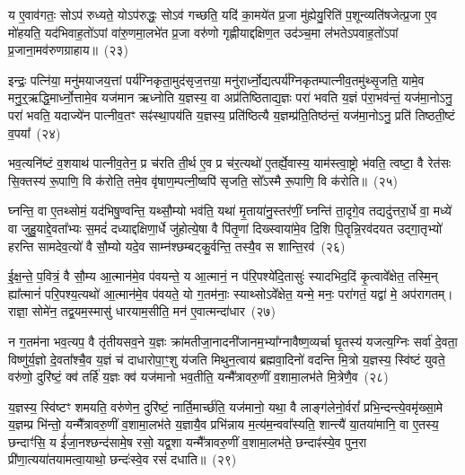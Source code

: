 य ए॒वाव॑गतः॒ सो\-ऽप॑ रुध्यते॒ यो\-ऽप॑रुद्धः॒ सो\-ऽव॑ गच्छति॒ यदि॑ का॒मये॑त प्र॒जा मु॑ह्येयु॒रिति॑ प॒शून्व्यति॑षजेत्प्र॒जा ए॒व मो॑हयति॒ यद॑भिवाह॒तो॑\-ऽपां वा॑रु॒णमा॒लभे॑त प्र॒जा वरु॑णो गृह्णीयाद्दक्षिण॒त उद॑ञ्च॒मा ल॑भते\-ऽपवाह॒तो॑\-ऽ\-पां प्र॒जाना॒मव॑रुणग्राहाय॥~(२३)

{\anuvakamend[{रेतो॒ यज॑माने दधाति लो॒क ऐ॒न्द्रꣳ स॒प्तत्रिꣳ॑शच्च}]}%

इन्द्रः॒ पत्नि॑या॒ मनु॑मयाजय॒त्तां पर्य॑ग्निकृता॒मुद॑सृज॒त्तया॒ मनु॑रार्ध्नो॒द्यत्पर्य॑ग्निकृतम्पात्नीव॒तमु॑थ्सृ॒जति॒ यामे॒व मनु॒र्॒\mbox{}ऋद्धि॒\-मार्ध्नो॒त्तामे॒व यज॑मान ऋध्नोति य॒ज्ञस्य॒ वा अप्र॑तिष्ठिताद्य॒ज्ञः परा॑ भवति य॒ज्ञं प॑रा॒भव॑न्तं॒ यज॑मा॒नो\-ऽनु॒ परा॑ भवति॒ यदाज्ये॑न पात्नीव॒तꣳ सꣴ॑स्था॒पय॑ति य॒ज्ञस्य॒ प्रति॑ष्ठित्यै य॒ज्ञम्प्र॑ति॒तिष्ठ॑न्तं॒ यज॑मा॒नो\-ऽनु॒ प्रति॑ तिष्ठती॒ष्टं व॒पया᳚~(२४)

भव॒त्यनि॑ष्टं व॒शयाथ॑ पात्नीव॒तेन॒ प्र च॑रति ती॒र्थ ए॒व प्र च॑र॒त्यथो॑ ए॒तर्\mbox{}ह्ये॒वास्य॒ याम॑स्त्वा॒ष्ट्रो भ॑वति॒ त्वष्टा॒ वै रेत॑सः सि॒क्तस्य॑ रू॒पाणि॒ वि क॑रोति॒ तमे॒व वृ॑षाण॒म्पत्नी॒ष्वपि॑ सृजति॒ सो᳚\-ऽस्मै रू॒पाणि॒ वि क॑रोति॥~(२५)

{\anuvakamend[{व॒पया॒ षट्त्रिꣳ॑शच्च}]}%

घ्नन्ति॒ वा ए॒तथ्सोमं॒ यद॑भिषु॒ण्वन्ति॒ यथ्सौ॒म्यो भव॑ति॒ यथा॑ मृ॒ताया॑नु॒स्तर॑णीं॒ घ्नन्ति॑ ता॒दृगे॒व तद्यदु॑त्तरा॒र्धे वा॒ मध्ये॑ वा जुहु॒याद्दे॒वता᳚भ्यः स॒मदं॑ दध्याद्दक्षिणा॒र्धे जु॑होत्ये॒षा वै पि॑तृ॒णां दिख्स्वाया॑मे॒व दि॒शि पि॒तॄन्नि॒रव॑दयत उद्गा॒तृभ्यो॑ हरन्ति सामदेव॒त्यो॑ वै सौ॒म्यो यदे॒व साम्न॑श्छम्बट्कु॒र्वन्ति॒ तस्यै॒व स शान्ति॒रव॑~(२६)

ई॒क्ष॒न्ते॒ प॒वित्रं॒ वै सौ॒म्य आ॒त्मान॑मे॒व प॑वयन्ते॒ य आ॒त्मानं॒ न प॑रि॒पश्ये॑दि॒तासुः॑ स्यादभिद॒दिं कृ॒त्वावे᳚क्षेत॒ तस्मि॒न् ह्या᳚त्मानं॑ परि॒पश्य॒त्यथो॑ आ॒त्मान॑मे॒व प॑वयते॒ यो ग॒तम॑नाः॒ स्याथ्सो\-ऽवे᳚क्षेत॒ यन्मे॒ मनः॒ परा॑गतं॒ यद्वा॑ मे॒ अप॑रागतम्। राज्ञा॒ सोमे॑न॒ तद्व॒यम॒स्मासु॑ धारयाम॒सीति॒ मन॑ ए॒वात्मन्दा॑धार~(२७)

न ग॒तम॑ना भव॒त्यप॒ वै तृ॑तीयसव॒ने य॒ज्ञः क्रा॑मतीजा॒नादनी॑जानम॒भ्या᳚ग्नावैष्ण॒व्यर्चा घृ॒तस्य॑ यजत्य॒ग्निः सर्वा॑ दे॒वता॒ विष्णु॑र्य॒ज्ञो दे॒वता᳚श्चै॒व य॒ज्ञं च॑ दाधारोपा॒ꣳ॒शु य॑जति मिथुन॒त्वाय॑ ब्रह्मवा॒दिनो॑ वदन्ति मि॒त्रो य॒ज्ञस्य॒ स्वि॑ष्टं युवते॒ वरु॑णो॒ दुरि॑ष्टं॒ क्व॑ तर्\mbox{}हि॑ य॒ज्ञः क्व॑ यज॑मानो भव॒तीति॒ यन्मै᳚त्रावरु॒णीं व॒शामा॒लभ॑ते मि॒त्रेणै॒व~(२८)

य॒ज्ञस्य॒ स्वि॑ष्टꣳ शमयति॒ वरु॑णेन॒ दुरि॑ष्टं॒ नार्ति॒मार्च्छ॑ति॒ यज॑मानो॒ यथा॒ वै लाङ्ग॑लेनो॒र्वरां᳚ प्रभि॒न्दन्त्ये॒वमृ॑ख्सा॒मे य॒ज्ञम्प्र भि॑न्तो॒ यन्मै᳚त्रावरु॒णीं व॒शामा॒लभ॑ते य॒ज्ञायै॒व प्रभि॑न्नाय म॒त्य॑म॒न्ववा᳚स्यति॒ शान्त्यै॑ या॒तया॑मानि॒ वा ए॒तस्य॒ छन्दाꣳ॑सि॒ य ई॑जा॒नश्छन्द॑सामे॒ष रसो॒ यद्व॒शा यन्मै᳚त्रावरु॒णीं व॒शामा॒लभ॑ते॒ छन्दाꣴ॑स्ये॒व पुन॒रा प्री॑णा॒त्यया॑तयामत्वा॒याथो॒ छन्दः॑स्वे॒व रसं॑ दधाति॥~(२९)

